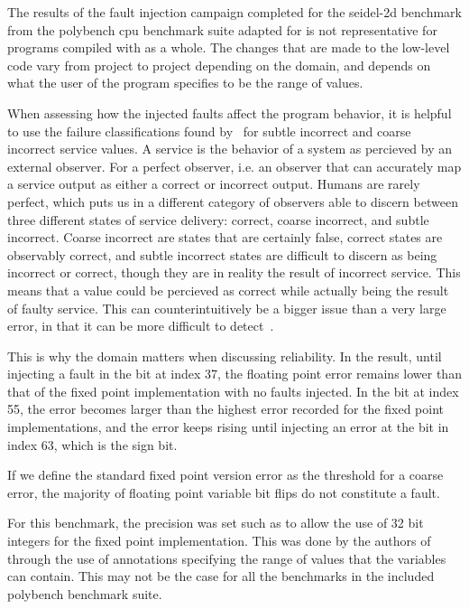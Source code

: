 The results of the fault injection campaign completed for the seidel-2d benchmark from the polybench cpu benchmark suite adapted for \taffo{} is not representative for programs compiled with \taffo{} as a whole. The changes that are made to the low-level code vary from project to project depending on the domain, and depends on what the user of the program specifies to be the range of values. 


When assessing how the injected faults affect the program behavior, it is helpful to use the failure classifications found by~\citet{failure_class_with_respect_to_detection} for subtle incorrect and coarse incorrect service values. A service is the behavior of a system as percieved by an external observer. For a perfect observer, i.e. an observer that can accurately map a service output as either a correct or incorrect output. Humans are rarely perfect, which puts us in a different category of observers able to discern between three different states of service delivery: correct, coarse incorrect, and subtle incorrect.  Coarse incorrect are states that are certainly false, correct states are observably correct, and subtle incorrect states are difficult to discern as being incorrect or correct, though they are in reality the result of incorrect service. This means that a value could be percieved as correct while actually being the result of faulty service. This can counterintuitively be a bigger issue than a very large error, in that it can be more difficult to detect~\citep{hodge2004survey}.

This is why the domain matters when discussing reliability. In the result, until injecting a fault in the bit at index 37, the floating point error remains lower than that of the fixed point implementation with no faults injected. In the bit at index 55, the error becomes larger than the highest error recorded for the fixed point implementations, and the error keeps rising until injecting an error at the bit in index 63, which is the sign bit.

If we define the standard fixed point version error as the threshold for a coarse error, the majority of floating point variable bit flips do not constitute a fault. 

For this benchmark, the precision was set such as to allow the use of 32 bit integers for the fixed point implementation. This was done by the authors of \taffo{} through the use of annotations specifying the range of values that the variables can contain. This may not be the case for all the benchmarks in the included polybench benchmark suite.

